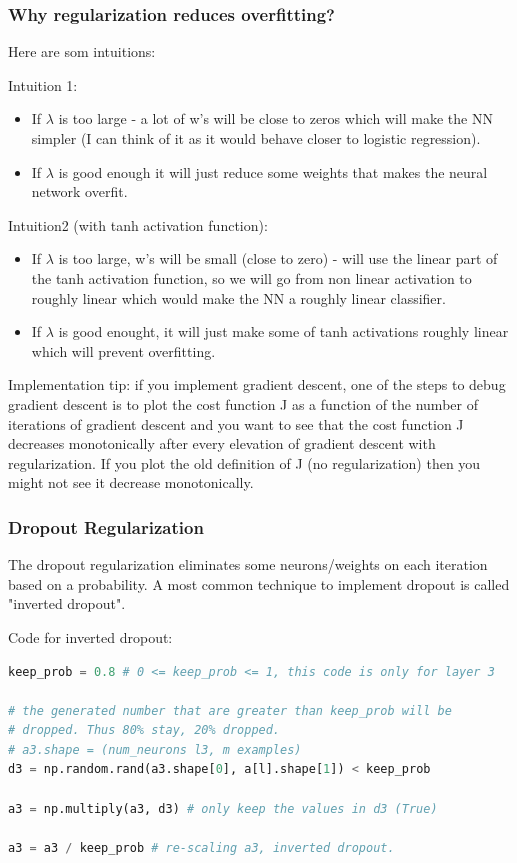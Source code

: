 \subsubsection{Why regularization reduces overfitting?}
Here are som intuitions:

Intuition 1:
\begin{itemize}
    \item If $\lambda$ is too large - a lot of w's will be close to zeros which will make the NN simpler (I can think of it as it would behave closer to logistic regression).
    \item If $\lambda$ is good enough it will just reduce some weights that makes the neural network overfit.
\end{itemize}

Intuition2 (with tanh activation function):
\begin{itemize}
    \item If $\lambda$ is too large, w's will be small (close to zero) - will use the linear part of the tanh activation function, so we will go from non linear activation to roughly linear which would make the NN a roughly linear classifier.
    \item If $\lambda$ is good enought, it will just make some of tanh activations roughly linear which will prevent overfitting.
\end{itemize}

Implementation tip: if you implement gradient descent, one of the steps to debug gradient descent is to plot the cost function J as a function of the number of iterations of gradient descent and you want to see that the cost function J decreases monotonically after every elevation of gradient descent with regularization. If you plot the old definition of J (no regularization) then you might not see it decrease monotonically.

\subsubsection{Dropout Regularization}
The dropout regularization eliminates some neurons/weights on each iteration based on a probability. A most common technique to implement dropout is called "inverted dropout".

Code for inverted dropout:

\begin{lstlisting}[language=python]
keep_prob = 0.8 # 0 <= keep_prob <= 1, this code is only for layer 3

# the generated number that are greater than keep_prob will be 
# dropped. Thus 80% stay, 20% dropped.
# a3.shape = (num_neurons l3, m examples)
d3 = np.random.rand(a3.shape[0], a[l].shape[1]) < keep_prob

a3 = np.multiply(a3, d3) # only keep the values in d3 (True)

a3 = a3 / keep_prob # re-scaling a3, inverted dropout.
\end{lstlisting}

